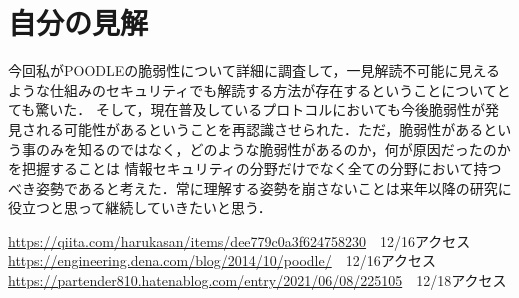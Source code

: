 \documentclass[dvipdfmx]{jarticle}
\begin{document}
\section{自分の見解}
今回私がPOODLEの脆弱性について詳細に調査して，一見解読不可能に見えるような仕組みのセキュリティでも解読する方法が存在するということについてとても驚いた．
そして，現在普及しているプロトコルにおいても今後脆弱性が発見される可能性があるということを再認識させられた．ただ，脆弱性があるという事のみを知るのではなく，どのような脆弱性があるのか，何が原因だったのかを把握することは
情報セキュリティの分野だけでなく全ての分野において持つべき姿勢であると考えた．常に理解する姿勢を崩さないことは来年以降の研究に役立つと思って継続していきたいと思う．
\begin{thebibliography}{99}
     \url{https://qiita.com/harukasan/items/dee779c0a3f624758230}　12/16アクセス
     \url{https://engineering.dena.com/blog/2014/10/poodle/}　12/16アクセス
     \url{https://partender810.hatenablog.com/entry/2021/06/08/225105}　12/18アクセス
\end{thebibliography}
\end{document}
